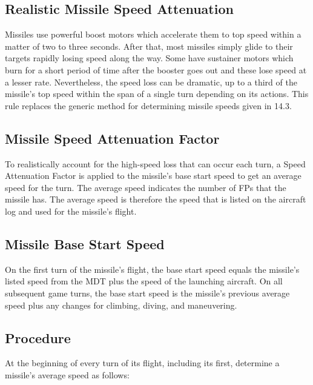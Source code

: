 \begin{advancedrules}

    \section{Realistic Missile Speed Attenuation}


    Missiles use powerful boost motors which accelerate them to top speed within a matter of two to three seconds. After that, most missiles simply glide to their targets rapidly losing speed along the way.  Some have sustainer motors which burn for a short period of time after the booster goes out and these lose speed at a lesser rate. Nevertheless, the speed loss can be dramatic, up to a third of the missile's top speed within the span of a single turn depending on its actions. This rule replaces the generic method for determining missile speeds given in 14.3.

    \subsection{Missile Speed Attenuation Factor} To realistically account for the high-speed loss that can occur each turn, a Speed Attenuation Factor is applied to the missile's base start speed to get an average speed for the turn. The average speed indicates the number of FPs that the missile has. The average speed is therefore the speed that is listed on the aircraft log and used for the missile's flight.

    \subsection{Missile Base Start Speed} On the first turn of the missile's flight, the base start speed equals the missile's listed speed from the MDT plus the speed of the launching aircraft. On all subsequent game turns, the base start speed is the missile's previous average speed plus any changes for climbing, diving, and maneuvering.

    \subsection{Procedure} At the beginning of every turn of its flight, including its first, determine a missile's average speed as follows:


\end{advancedrules}

